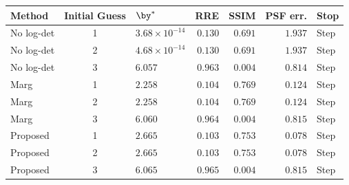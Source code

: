 \begin{tabular}{@{}lclrrrl@{}}
\toprule
Method & Initial Guess & $\by^*$ & RRE & SSIM & PSF err. & Stop \\
\midrule
No log-det & 1 & $3.68\times10^{-14}$ & $0.130$ & $0.691$ & $1.937$ & Step \\
No log-det & 2 & $4.68\times10^{-14}$ & $0.130$ & $0.691$ & $1.937$ & Step \\
No log-det & 3 & $6.057$ & $0.963$ & $0.004$ & $0.814$ & Step \\
\addlinespace[3pt]
Marg & 1 & $2.258$ & $0.104$ & $\mathbf{0.769}$ & $0.124$ & Step \\
Marg & 2 & $2.258$ & $0.104$ & $\mathbf{0.769}$ & $0.124$ & Step \\
Marg & 3 & $6.060$ & $0.964$ & $0.004$ & $0.815$ & Step \\
\addlinespace[3pt]
Proposed & 1 & $2.665$ & $\mathbf{0.103}$ & $0.753$ & $\mathbf{0.078}$ & Step \\
Proposed & 2 & $2.665$ & $\mathbf{0.103}$ & $0.753$ & $\mathbf{0.078}$ & Step \\
Proposed & 3 & $6.065$ & $0.965$ & $0.004$ & $0.815$ & Step \\
\bottomrule
\end{tabular}
